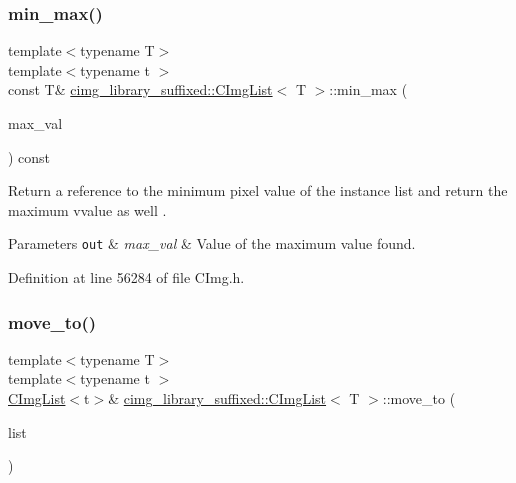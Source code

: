 \subsubsection{\texorpdfstring{min\+\_\+max()}{min\_max()}\hspace{0.1cm}{\footnotesize\ttfamily [2/2]}}
{\footnotesize\ttfamily template$<$typename T$>$ \\
template$<$typename t $>$ \\
const T\& \hyperlink{structcimg__library__suffixed_1_1CImgList}{cimg\+\_\+library\+\_\+suffixed\+::\+C\+Img\+List}$<$ T $>$\+::min\+\_\+max (\begin{DoxyParamCaption}\item[{t \&}]{max\+\_\+val }\end{DoxyParamCaption}) const\hspace{0.3cm}{\ttfamily [inline]}}



Return a reference to the minimum pixel value of the instance list and return the maximum vvalue as well . 


\begin{DoxyParams}[1]{Parameters}
\mbox{\tt out}  & {\em max\+\_\+val} & Value of the maximum value found. \\
\hline
\end{DoxyParams}


Definition at line 56284 of file C\+Img.\+h.

\mbox{\label{structcimg__library__suffixed_1_1CImgList_aa70386a8220b072cfebd654cb1ea636a}} 
\subsubsection{\texorpdfstring{move\+\_\+to()}{move\_to()}\hspace{0.1cm}{\footnotesize\ttfamily [1/2]}}
{\footnotesize\ttfamily template$<$typename T$>$ \\
template$<$typename t $>$ \\
\hyperlink{structcimg__library__suffixed_1_1CImgList}{C\+Img\+List}$<$t$>$\& \hyperlink{structcimg__library__suffixed_1_1CImgList}{cimg\+\_\+library\+\_\+suffixed\+::\+C\+Img\+List}$<$ T $>$\+::move\+\_\+to (\begin{DoxyParamCaption}\item[{\hyperlink{structcimg__library__suffixed_1_1CImgList}{C\+Img\+List}$<$ t $>$ \&}]{list }\end{DoxyParamCaption})\hspace{0.3cm}{\ttfamily [inline]}}



